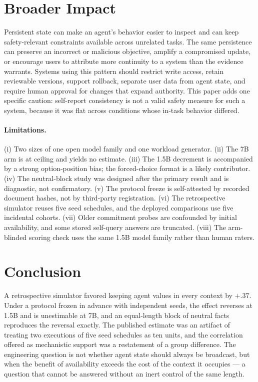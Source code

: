 \documentclass[11pt]{article}
\begin{document}
\section*{Broader Impact}
Persistent state can make an agent's behavior easier to inspect and can keep safety-relevant constraints available across unrelated tasks. The same persistence can preserve an incorrect or malicious objective, amplify a compromised update, or encourage users to attribute more continuity to a system than the evidence warrants. Systems using this pattern should restrict write access, retain reviewable versions, support rollback, separate user data from agent state, and require human approval for changes that expand authority. This paper adds one specific caution: self-report consistency is not a valid safety measure for such a system, because it was flat across conditions whose in-task behavior differed.

\paragraph{Limitations.} (i) Two sizes of one open model family and one workload generator. (ii) The 7B arm is at ceiling and yields no estimate. (iii) The 1.5B decrement is accompanied by a strong option-position bias; the forced-choice format is a likely contributor. (iv) The neutral-block study was designed after the primary result and is diagnostic, not confirmatory. (v) The protocol freeze is self-attested by recorded document hashes, not by third-party registration. (vi) The retrospective simulator reuses five seed schedules, and the deployed comparisons use five incidental cohorts. (vii) Older commitment probes are confounded by initial availability, and some stored self-query answers are truncated. (viii) The arm-blinded scoring check uses the same 1.5B model family rather than human raters.

\section{Conclusion}
A retrospective simulator favored keeping agent values in every context by $+.37$. Under a protocol frozen in advance with independent seeds, the effect reverses at 1.5B and is unestimable at 7B, and an equal-length block of neutral facts reproduces the reversal exactly. The published estimate was an artifact of treating two executions of five seed schedules as ten units, and the correlation offered as mechanistic support was a restatement of a group difference. The engineering question is not whether agent state should always be broadcast, but when the benefit of availability exceeds the cost of the context it occupies --- a question that cannot be answered without an inert control of the same length.
\end{document}
